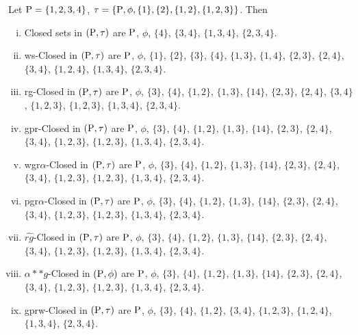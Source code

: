 \begin{exm}\label{exm2.2.15}
Let $\mathrm{P} = \{1, 2, 3, 4\}$, $\tau = \{\mathrm{P},\phi, \{1\}, \{2\}, \{1, 2\}, \{1, 2, 3\}\}$. Then 
\begin{enumerate}[(i)]
\item Closed sets in $(\mathrm{P}, \tau)$ are $\mathrm{P}$, $\phi$, $\{4\}$, $\{3, 4\}$, $\{1, 3, 4\}$, $\{2, 3, 4\}$.

\item ws-Closed in $(\mathrm{P}, \tau)$ are $\mathrm{P}$, $\phi$, $\{1\}$, $\{2\}$, $\{3\}$, $\{4\}$, $\{1, 3\}$, $\{1, 4\}$, $\{2, 3\}$, $\{2, 4\}$, $\{3, 4\}$, $\{1, 2, 4\}$, $\{1, 3, 4\}$, $\{2, 3, 4\}$.

\item rg-Closed in $(\mathrm{P}, \tau)$ are $\mathrm{P}$, $\phi$, $\{3\}$, $\{4\}$, $\{1, 2\}$, $\{1, 3\}$, $\{1 4\}$, $\{2, 3\}$, $\{2, 4\}$, $\{3, 4\}$, $\{1, 2, 3\}$, $\{1, 2, 3\}$, $\{1, 3, 4\}$, $\{2, 3, 4\}$.

\item gpr-Closed in $(\mathrm{P}, \tau)$ are $\mathrm{P}$, $\phi$, $\{3\}$, $\{4\}$, $\{1, 2\}$, $\{1, 3\}$, $\{1 4\}$, $\{2, 3\}$, $\{2, 4\}$, $\{3, 4\}$, $\{1, 2, 3\}$, $\{1, 2, 3\}$, $\{1, 3, 4\}$, $\{2, 3, 4\}$.

\item wgr$\alpha$-Closed in $(\mathrm{P}, \tau)$ are $\mathrm{P}$, $\phi$, $\{3\}$, $\{4\}$, $\{1, 2\}$, $\{1, 3\}$, $\{1 4\}$, $\{2, 3\}$, $\{2, 4\}$, $\{3, 4\}$, $\{1, 2, 3\}$, $\{1, 2, 3\}$, $\{1, 3, 4\}$, $\{2, 3, 4\}$.

\item pgr$\alpha$-Closed in $(\mathrm{P}, \tau)$ are $\mathrm{P}$, $\phi$, $\{3\}$, $\{4\}$, $\{1, 2\}$, $\{1, 3\}$, $\{1 4\}$, $\{2, 3\}$, $\{2, 4\}$, $\{3, 4\}$, $\{1, 2, 3\}$, $\{1, 2, 3\}$, $\{1, 3, 4\}$, $\{2, 3, 4\}$.

\item $\widehat{rg}$-Closed in $(\mathrm{P}, \tau)$ are $\mathrm{P}$, $\phi$, $\{3\}$, $\{4\}$, $\{1, 2\}$, $\{1, 3\}$, $\{1 4\}$, $\{2, 3\}$, $\{2, 4\}$, $\{3, 4\}$, $\{1, 2, 3\}$, $\{1, 2, 3\}$, $\{1, 3, 4\}$, $\{2, 3, 4\}$.

\item $\alpha{*}{*} g$-Closed in $(\mathrm{P}, \phi)$ are $\mathrm{P}$, $\phi$, $\{3\}$, $\{4\}$, $\{1, 2\}$, $\{1, 3\}$, $\{1 4\}$, $\{2, 3\}$, $\{2, 4\}$, $\{3, 4\}$, $\{1, 2,3\}$, $\{1, 2, 3\}$, $\{1, 3, 4\}$, $\{2, 3, 4\}$.

\item gprw-Closed in $(\mathrm{P}, \tau)$ are $\mathrm{P}$, $\phi$, $\{3\}$, $\{4\}$, $\{1, 2\}$, $\{3, 4\}$, $\{1, 2, 3\}$, $\{1, 2, 4\}$, $\{1, 3, 4\}$, $\{2, 3,4\}$.


\end{enumerate}
\end{exm}
